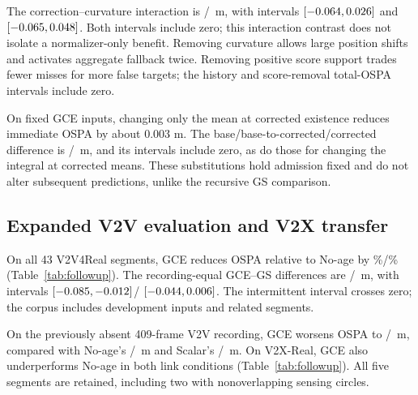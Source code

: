 The correction--curvature interaction is
\RevSeenInteractionReliableMean/\RevSeenInteractionIntermittentMean\ m,
with intervals
$[-0.064,0.026]$ and
$[-0.065,0.048]$.
Both intervals include zero; this interaction contrast does not isolate
a normalizer-only benefit.
Removing curvature allows large position shifts and activates aggregate
fallback twice. Removing positive score support trades fewer misses
for more false targets; the history and score-removal total-OSPA
intervals include zero.

On fixed GCE inputs, changing only the mean at corrected existence
reduces immediate OSPA by about 0.003 m. The
base/base-to-corrected/corrected difference is
\JointReliableBothMean/\JointIntermittentBothMean\ m, and its intervals
include zero, as do those for changing the integral at corrected means.
These substitutions hold admission fixed and do not alter subsequent
predictions, unlike the recursive GS comparison.

\subsection{Expanded V2V evaluation and V2X transfer}
On all 43 V2V4Real segments, GCE reduces OSPA relative to No-age by
\FollowGainNoAgeReliable\%/\FollowGainNoAgeIntermittent\%
(Table~\ref{tab:followup}). The recording-equal GCE--GS differences are
\FollowRecordingGSReliableMean/\FollowRecordingGSIntermittentMean\ m,
with intervals
$[-0.085,-0.012]$/
$[-0.044,0.006]$.
The intermittent interval crosses zero; the corpus includes development
inputs and related segments.

On the previously absent 409-frame V2V recording, GCE worsens OSPA to
\RevNewRecordingGCEReliable/\RevNewRecordingGCEIntermittent\ m,
compared with No-age's
\RevNewRecordingNoAgeReliable/\RevNewRecordingNoAgeIntermittent\ m
and Scalar's \RevNewRecordingScalarReliable/\RevNewRecordingScalarIntermittent\ m.
On V2X-Real, GCE also underperforms No-age in both link conditions
(Table~\ref{tab:followup}).
All five segments are retained, including two with nonoverlapping
sensing circles.

